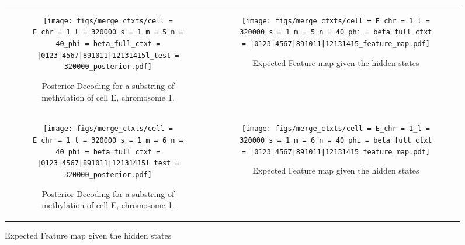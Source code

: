 \documentclass{article}
\begin{document}
\begin{figure}[H]
    \begin{tabular}{cc}
      \begin{subfigure}[t]{0.4\textwidth}
        \texttt{[image: figs/merge\_ctxts/cell = E\_chr = 1\_l = 320000\_s = 1\_m = 5\_n = 40\_phi = beta\_full\_ctxt = |0123|4567|891011|12131415l\_test = 320000\_posterior.pdf]}
        \caption{Posterior Decoding for a substring of methylation of cell E, chromosome 1.}
      \end{subfigure}
      &
      \begin{subfigure}[t]{0.6\textwidth}
        \texttt{[image: figs/merge\_ctxts/cell = E\_chr = 1\_l = 320000\_s = 1\_m = 5\_n = 40\_phi = beta\_full\_ctxt = |0123|4567|891011|12131415\_feature\_map.pdf]}
        \caption{Expected Feature map given the hidden states}
      \end{subfigure}
      \\
      \begin{subfigure}[t]{0.4\textwidth}
        \texttt{[image: figs/merge\_ctxts/cell = E\_chr = 1\_l = 320000\_s = 1\_m = 6\_n = 40\_phi = beta\_full\_ctxt = |0123|4567|891011|12131415l\_test = 320000\_posterior.pdf]}
        \caption{Posterior Decoding for a substring of methylation of cell E, chromosome 1.}
      \end{subfigure}
      &
      \begin{subfigure}[t]{0.6\textwidth}
        \texttt{[image: figs/merge\_ctxts/cell = E\_chr = 1\_l = 320000\_s = 1\_m = 6\_n = 40\_phi = beta\_full\_ctxt = |0123|4567|891011|12131415\_feature\_map.pdf]}
        \caption{Expected Feature map given the hidden states}
      \end{subfigure}
  \end{tabular}
\end{figure}
\end{document}
